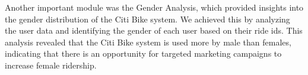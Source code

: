 \documentclass[journal]{vgtc}                     %
\begin{document}
Another important module was the Gender Analysis, which provided insights into the gender distribution of the Citi Bike system. We achieved this by analyzing the user data and identifying the gender of each user based on their ride ids. This analysis revealed that the Citi Bike system is used more by male than females, indicating that there is an opportunity for targeted marketing campaigns to increase female ridership.
\end{document}
